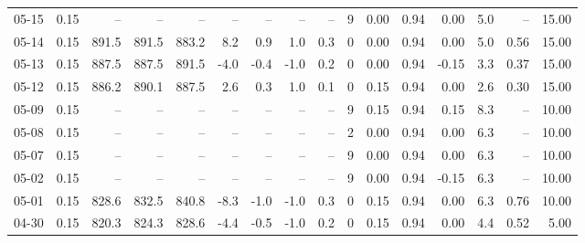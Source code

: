 \begin{threeparttable}
{\begin{tabular}{lrrrrrrrrrrrrrrr}
  05-15 &     0.15 &    -- &    -- &    -- &         -- &             -- &                       -- &                  -- &              9 &       0.00 &      0.94 &           0.00 &              5.0 &              -- &                  15.00 \\
  05-14 &     0.15 & 891.5 & 891.5 & 883.2 &        8.2 &            0.9 &                      1.0 &                 0.3 &              0 &       0.00 &      0.94 &           0.00 &              5.0 &            0.56 &                  15.00 \\
  05-13 &     0.15 & 887.5 & 887.5 & 891.5 &       -4.0 &           -0.4 &                     -1.0 &                 0.2 &              0 &       0.00 &      0.94 &          -0.15 &              3.3 &            0.37 &                  15.00 \\
  05-12 &     0.15 & 886.2 & 890.1 & 887.5 &        2.6 &            0.3 &                      1.0 &                 0.1 &              0 &       0.15 &      0.94 &           0.00 &              2.6 &            0.30 &                  15.00 \\
  05-09 &     0.15 &    -- &    -- &    -- &         -- &             -- &                       -- &                  -- &              9 &       0.15 &      0.94 &           0.15 &              8.3 &              -- &                  10.00 \\
  05-08 &     0.15 &    -- &    -- &    -- &         -- &             -- &                       -- &                  -- &              2 &       0.00 &      0.94 &           0.00 &              6.3 &              -- &                  10.00 \\
  05-07 &     0.15 &    -- &    -- &    -- &         -- &             -- &                       -- &                  -- &              9 &       0.00 &      0.94 &           0.00 &              6.3 &              -- &                  10.00 \\
  05-02 &     0.15 &    -- &    -- &    -- &         -- &             -- &                       -- &                  -- &              9 &       0.00 &      0.94 &          -0.15 &              6.3 &              -- &                  10.00 \\
  05-01 &     0.15 & 828.6 & 832.5 & 840.8 &       -8.3 &           -1.0 &                     -1.0 &                 0.3 &              0 &       0.15 &      0.94 &           0.00 &              6.3 &            0.76 &                  10.00 \\
  04-30 &     0.15 & 820.3 & 824.3 & 828.6 &       -4.4 &           -0.5 &                     -1.0 &                 0.2 &              0 &       0.15 &      0.94 &           0.00 &              4.4 &            0.52 &                   5.00 \\

\end{tabular}}
\end{threeparttable}

